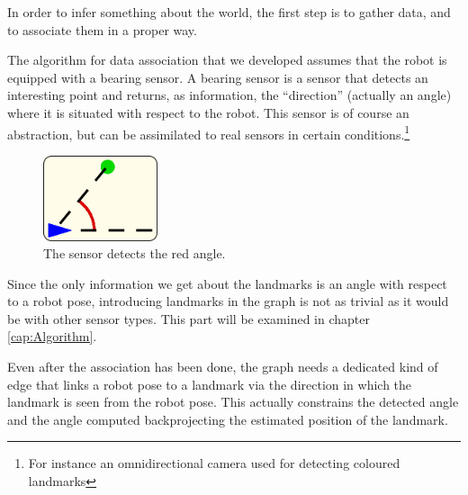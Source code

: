 In order to infer something about the world, the first step is to gather data, and to associate them in a proper way.

The algorithm for data association that we developed assumes that the robot is equipped with a bearing sensor. A bearing sensor is a sensor that detects an interesting point and returns, as information, the ``direction'' (actually an angle) where it is situated with respect to the robot.
This sensor is of course an abstraction, but can be assimilated to real sensors in certain conditions.\footnote{For instance an omnidirectional camera used for detecting coloured landmarks}

\begin{figure}[htbp]
  \centering
    \includegraphics[width=0.3\textwidth]{images/bearing_sensor.png}
  \caption{The sensor detects the red angle.}
  \label{fig:bearing_sensor}
\end{figure}

Since the only information we get about the landmarks is an angle with respect to a robot pose, introducing landmarks in the graph is not as trivial as it would be with other sensor types. This part will be examined in chapter \ref{cap:Algorithm}.

Even after the association has been done, the graph needs a dedicated kind of edge that links a robot pose to a landmark via the direction in which the landmark is seen from the robot pose. This actually constrains the detected angle and the angle computed backprojecting the estimated position of the landmark.

